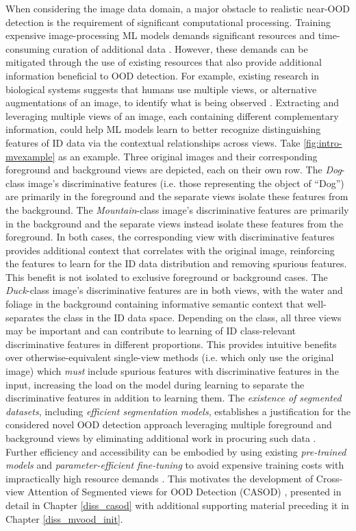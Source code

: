 When considering the image data domain, a major obstacle to realistic near-OOD detection is the requirement of significant computational processing. Training expensive image-processing ML models demands significant resources and time-consuming curation of additional data \cite{houlsby2019parameter,hu2021lora,ridnik2021imagenet}. However, these demands can be mitigated through the use of existing resources that also provide additional information beneficial to OOD detection. For example, existing research in biological systems suggests that humans use multiple views, or alternative augmentations of an image, to identify what is being observed \cite{weiner2016anatomical,vuilleumier2002multiple}. Extracting and leveraging multiple views of an image, each containing different complementary information, could help ML models learn to better recognize distinguishing features of ID data via the contextual relationships across views. Take \ref{fig:intro-mvexample} as an example. Three original images and their corresponding foreground and background views are depicted, each on their own row. The \textit{Dog}-class image's discriminative features (i.e. those representing the object of ``Dog'') are primarily in the foreground and the separate views isolate these features from the background. The \textit{Mountain}-class image's discriminative features are primarily in the background and the separate views instead isolate these features from the foreground. In both cases, the corresponding view with discriminative features provides additional context that correlates with the original image, reinforcing the features to learn for the ID data distribution and removing spurious features. This benefit is not isolated to exclusive foreground or background cases. The \textit{Duck}-class image's discriminative features are in both views, with the water and foliage in the background containing informative semantic context that well-separates the class in the ID data space. Depending on the class, all three views may be important and can contribute to learning of ID class-relevant discriminative features in different proportions. This provides intuitive benefits over otherwise-equivalent single-view methods (i.e. which only use the original image) which \textit{must} include spurious features with discriminative features in the input, increasing the load on the model during learning to separate the discriminative features in addition to learning them. The \textit{existence of segmented datasets}, including \textit{efficient segmentation models}, establishes a justification for the considered novel OOD detection approach leveraging multiple foreground and background views by eliminating additional work in procuring such data \cite{lin2021real,drygala2022background,jocher2020ultralytics,qin2020u2}. Further efficiency and accessibility can be embodied by using existing \textit{pre-trained models} and \textit{parameter-efficient fine-tuning} to avoid expensive training costs with impractically high resource demands \cite{hu2021lora,sun2022out,chen2021empirical}. This motivates the development of Cross-view Attention of Segmented views for OOD Detection (CASOD) \cite{politowicz2026improving}, presented in detail in Chapter \ref{diss_casod} with additional supporting material preceding it in Chapter \ref{diss_mvood_init}.

